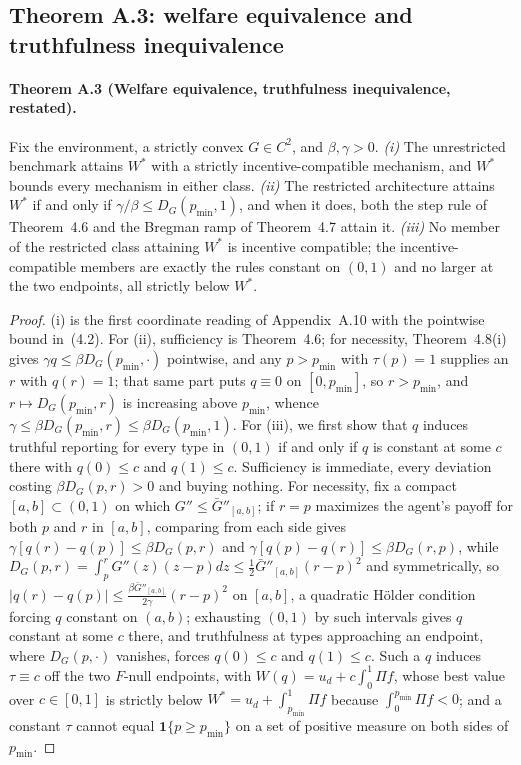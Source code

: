 \documentclass[acmsmall,nonacm,screen]{acmart}
\theoremstyle{acmplain}%
\theoremstyle{acmdefinition}%
\numberwithin{equation}{section}
\begin{document}
\begin{appendix}
\subsection{Theorem A.3: welfare equivalence and truthfulness inequivalence}

\paragraph*{Theorem A.3 (Welfare equivalence, truthfulness inequivalence, restated).}
Fix the environment, a strictly convex $G\in C^2$, and $\beta,\gamma>0$. \emph{(i)} The unrestricted benchmark attains $W^*$ with a strictly incentive-compatible mechanism, and $W^*$ bounds every mechanism in either class. \emph{(ii)} The restricted architecture attains $W^*$ if and only if $\gamma/\beta\leq D_G(p_{\min},1)$, and when it does, both the step rule of Theorem~4.6 and the Bregman ramp of Theorem~4.7 attain it. \emph{(iii)} No member of the restricted class attaining $W^*$ is incentive compatible; the incentive-compatible members are exactly the rules constant on $(0,1)$ and no larger at the two endpoints, all strictly below $W^*$.

\begin{proof}
(i) is the first coordinate reading of Appendix~A.10 with the pointwise bound in~(4.2). For (ii), sufficiency is Theorem~4.6; for necessity, Theorem~4.8(i) gives $\gamma q\leq\beta D_G(p_{\min},\cdot)$ pointwise, and any $p>p_{\min}$ with $\tau(p)=1$ supplies an $r$ with $q(r)=1$; that same part puts $q\equiv0$ on $[0,p_{\min}]$, so $r>p_{\min}$, and $r\mapsto D_G(p_{\min},r)$ is increasing above $p_{\min}$, whence $\gamma\leq\beta D_G(p_{\min},r)\leq\beta D_G(p_{\min},1)$. For (iii), we first show that $q$ induces truthful reporting for every type in $(0,1)$ if and only if $q$ is constant at some $c$ there with $q(0)\leq c$ and $q(1)\leq c$. Sufficiency is immediate, every deviation costing $\beta D_G(p,r)>0$ and buying nothing. For necessity, fix a compact $[a,b]\subset(0,1)$ on which $G''\leq\bar G''_{[a,b]}$; if $r=p$ maximizes the agent's payoff for both $p$ and $r$ in $[a,b]$, comparing from each side gives $\gamma[q(r)-q(p)]\leq\beta D_G(p,r)$ and $\gamma[q(p)-q(r)]\leq\beta D_G(r,p)$, while $D_G(p,r)=\int_p^rG''(z)(z-p)dz\leq\tfrac12\bar G''_{[a,b]}(r-p)^2$ and symmetrically, so $|q(r)-q(p)|\leq\frac{\beta\bar G''_{[a,b]}}{2\gamma}(r-p)^2$ on $[a,b]$, a quadratic H\"older condition forcing $q$ constant on $(a,b)$; exhausting $(0,1)$ by such intervals gives $q$ constant at some $c$ there, and truthfulness at types approaching an endpoint, where $D_G(p,\cdot)$ vanishes, forces $q(0)\leq c$ and $q(1)\leq c$. Such a $q$ induces $\tau\equiv c$ off the two $F$-null endpoints, with $W(q)=u_d+c\int_0^1\Pi f$, whose best value over $c\in[0,1]$ is strictly below $W^*=u_d+\int_{p_{\min}}^1\Pi f$ because $\int_0^{p_{\min}}\Pi f<0$; and a constant $\tau$ cannot equal $\mathbf 1\{p\geq p_{\min}\}$ on a set of positive measure on both sides of $p_{\min}$.
\end{proof}



\end{appendix}
\end{document}
